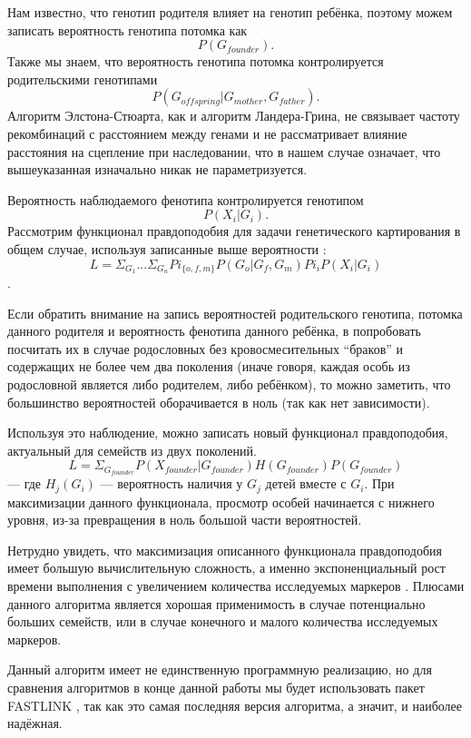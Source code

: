 \documentclass{matmex-diploma-custom}
\begin{document}
Нам известно, что генотип родителя влияет на генотип ребёнка, поэтому
можем записать вероятность генотипа потомка как $$P(G_{founder}).$$
Также мы знаем, что вероятность генотипа потомка контролируется
родительскими генотипами $$P(G_{offspring} | G_{mother},
G_{father}).$$ Алгоритм Элстона-Стюарта, как и алгоритм Ландера-Грина,
не связывает частоту рекомбинаций с расстоянием между генами и не
рассматривает влияние расстояния на сцепление при наследовании, что в
нашем случае означает, что вышеуказанная изначально никак не
параметризуется.

Вероятность наблюдаемого фенотипа контролируется генотипом $$P(X_{i} |
G_{i}).$$ Рассмотрим функционал правдоподобия для задачи генетического
картирования в общем случае, используя записанные выше вероятности
\cite{elston1971general}: $$L =
\Sigma_{G_{1}}...\Sigma_{G_{n}}Pi_{\{o,f,m\}}P(G_{o} | G_{f}, G_{m})
Pi_{i}P(X_{i} | G_{i})$$.

Если обратить внимание на запись вероятностей родительского генотипа,
потомка данного родителя и вероятность фенотипа данного ребёнка, в
попробовать посчитать их в случае родословных без кровосмесительных
``браков'' и содержащих не более чем два поколения (иначе говоря,
каждая особь из родословной является либо родителем, либо ребёнком),
то можно заметить, что большинство вероятностей оборачивается в ноль
(так как нет зависимости).

Используя это наблюдение, можно записать новый функционал
правдоподобия, актуальный для семейств из двух поколений.$$L =
\Sigma_{G_{founder}}P(X_{founder}|G_{founder})H(G_{founder})P(G_{founder})$$
--- где $H_{j}(G_{i})$ --- вероятность наличия у $G_{j}$ детей вместе
с $G_{i}$. При максимизации данного функционала, просмотр особей
начинается с нижнего уровня, из-за превращения в ноль большой части
вероятностей.

Нетрудно увидеть, что максимизация описанного функционала
правдоподобия имеет большую вычислительную сложность, а именно
экспоненциальный рост времени выполнения с увеличением количества
исследуемых маркеров \cite{fishelson2002exact}. Плюсами данного
алгоритма является хорошая применимость в случае потенциально больших
семейств, или в случае конечного и малого количества исследуемых
маркеров.

Данный алгоритм имеет не единственную программную реализацию, но для
сравнения алгоритмов в конце данной работы мы будет использовать пакет
FASTLINK \cite{faslinkUrl}, так как это самая последняя версия
алгоритма, а значит, и наиболее надёжная.
\end{document}
